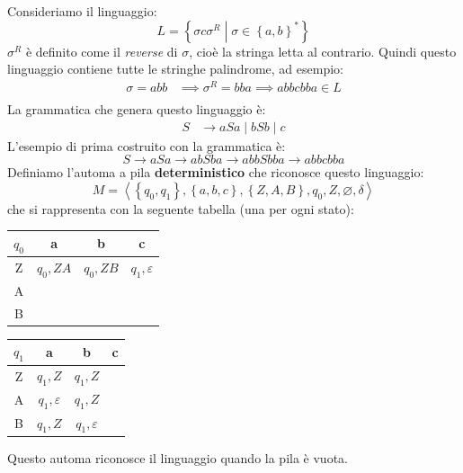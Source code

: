 \documentclass[a4paper]{article}
\begin{document}
\begin{example}
  Consideriamo il linguaggio:
  \[
  L = \left\{ \sigma c \sigma^R \;\left|\; \sigma \in \left\{ a, b \right\}^* \right. \right\}
  \] 
  \( \sigma^R \) è definito come il \textit{reverse} di \( \sigma \), cioè la stringa
  letta al contrario. Quindi questo linguaggio contiene tutte le stringhe palindrome,
  ad esempio:
  \[
  \begin{aligned}
    \sigma = abb &\implies \sigma^R = bba \implies abb c bba \in L\\
  \end{aligned}
  \] 
  La grammatica che genera questo linguaggio è:
  \[
    \begin{aligned}
      S &\to aSa \;|\; bSb \;|\; c
    \end{aligned}
  \] 
  L'esempio di prima costruito con la grammatica è:
  \[
    S \to aSa \to abSba \to abbS bba \to abb c bba
  \] 
  Definiamo l'automa a pila \textbf{deterministico} che riconosce questo linguaggio:
  \[
    M = \left< \left\{ q_0, q_1 \right\}, \left\{ a, b, c \right\}, \left\{ Z, A, B \right\},
    q_0, Z, \varnothing, \delta \right>
  \] 
  che si rappresenta con la seguente tabella (una per ogni stato):
  \begin{table}[H]
    \centering
    \begin{minipage}{0.45\textwidth}
      \centering
      \begin{tabular}{|c|c|c|c|}
        \hline
        \( q_0 \) & a & b & c \\
        \hline
        Z & \( q_0, ZA \) & \( q_0, ZB \) & \( q_1, \varepsilon \) \\
        \hline
        A & \(  \) & \(  \) & \(  \) \\
        \hline
        B & \(  \) & \(  \) & \(  \) \\
        \hline
      \end{tabular}
    \end{minipage}
    \begin{minipage}{0.45\textwidth}
      \centering
      \begin{tabular}{|c|c|c|c|}
        \hline
        \( q_1 \) & a & b & c \\
        \hline
        Z & \( q_1, Z \) & \( q_1, Z \) & \(  \) \\
        \hline
        A & \( q_1, \varepsilon \) & \( q_1, Z \) & \(  \) \\
        \hline
        B & \( q_1, Z \) & \( q_1, \varepsilon \) & \(  \) \\
        \hline
      \end{tabular}
    \end{minipage}
  \end{table}
  \label{10-11-D1}
  Questo automa riconosce il linguaggio quando la pila è vuota.
\end{example}
\end{document}

